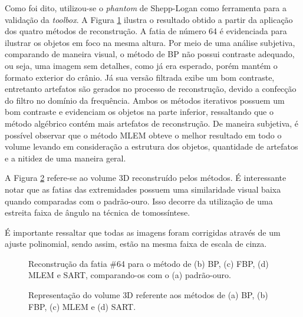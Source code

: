 Como foi dito, utilizou-se o \textit{phantom} de Shepp-Logan como ferramenta para a validação da \textit{toolbox}. A Figura \ref{fig:imgCap6SheppLogan} ilustra o resultado obtido a partir da aplicação dos quatro métodos de reconstrução. A fatia de número 64 é evidenciada para ilustrar os objetos em foco na mesma altura. Por meio de uma análise subjetiva, comparando de maneira visual, o método de \acs{BP} não possui contraste adequado, ou seja, uma imagem sem detalhes, como já era esperado, porém mantém o formato exterior do crânio. Já sua versão filtrada exibe um bom contraste, entretanto artefatos são gerados no processo de reconstrução, devido a confecção do filtro no domínio da frequência. Ambos os métodos iterativos possuem um bom contraste e evidenciam os objetos na parte inferior, ressaltando que o método algébrico contém mais artefatos de reconstrução. De maneira subjetiva,  é possível observar que o método \acs{MLEM} obteve o melhor resultado em todo o volume levando em consideração a estrutura dos objetos, quantidade de artefatos e a nitidez de uma maneira geral.
 
 A Figura \ref{fig:imgCap6SheppLogan3D_Recons} refere-se ao volume \acs{3D} reconstruído pelos métodos. É interessante notar que as fatias das extremidades possuem uma similaridade visual baixa quando comparadas com o padrão-ouro. Isso decorre da utilização de uma estreita faixa de ângulo na técnica de tomossíntese.
 
 É importante ressaltar que todas as imagens foram corrigidas através de um ajuste polinomial, sendo assim, estão na mesma faixa de escala de cinza.
    
 \begin{figure}[!h]
 	\centering	
 	\caption{Reconstrução da fatia \#64 para o método de (b) \acs{BP}, (c) \acs{FBP}, (d) \acs{MLEM} e \acs{SART}, comparando-os com o (a) padrão-ouro.}
 	\hfill
 	\hfill
 	\hfill
 	\hfill
 	\label{fig:imgCap6SheppLogan}
 \end{figure}

\begin{figure}[!h]
	\caption{Representação do volume \acs{3D} referente aos métodos de (a) \acs{BP}, (b) \acs{FBP}, (c) \acs{MLEM} e (d) \acs{SART}.}
 	\centering	
	\hfill
	\hfill
	\hfill
	\label{fig:imgCap6SheppLogan3D_Recons}
\end{figure}

